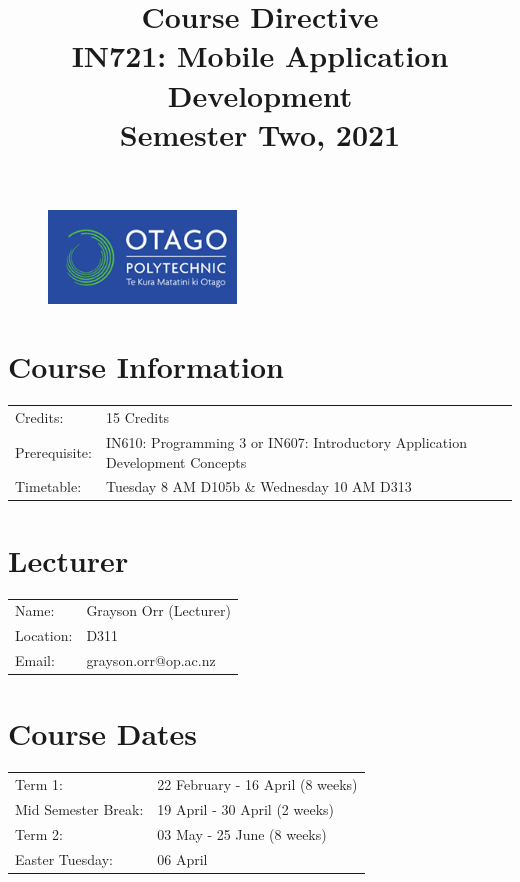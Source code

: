 \documentclass{article}
\author{}
\begin{document}
 

\begin{figure}
	\includegraphics[width=50mm]{../../resources/img/logo.png}
\end{figure} 

\title{Course Directive\\IN721: Mobile Application Development\\Semester Two, 2021}
\date{}
\maketitle

\section*{Course Information}
\begin{tabular}{ll}
	Credits:                      & 15 Credits                                                                   \\
	Prerequisite:                 & IN610: Programming 3 or IN607: Introductory Application Development Concepts \\
	Timetable:  & Tuesday 8 AM D105b \& Wednesday 10 AM D313                                                         \\
\end{tabular}

\section*{Lecturer}
\begin{tabular}{ll}
	Name:     & Grayson Orr (Lecturer) \\
	Location: & D311                   \\
	Email:    & grayson.orr@op.ac.nz   \\
\end{tabular}

\section*{Course Dates}
\begin{tabular}{ll}
	Term 1:             & 22 February - 16 April (8 weeks) \\
	Mid Semester Break: & 19 April - 30 April (2 weeks)    \\
	Term 2:             & 03 May - 25 June (8 weeks)        \\     
	Easter Tuesday:     & 06 April                             \\                 
\end{tabular}
\end{document}
